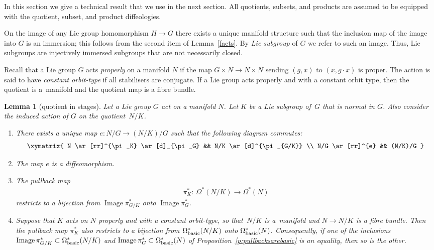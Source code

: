 \documentclass[pdftex]{sigma}
\numberwithin{equation}{section}
\newtheorem{Lemma}[Theorem]{Lemma}
\DeclareMathOperator {\image}{Image}
\begin{document}
In this section we give a technical result that we use in the next section.
All quotients, subsets, and products are assumed to be equipped
with the quotient, subset, and product dif\/feologies.

On the image of any Lie group homomorphism $H \to G$
there exists a unique manifold structure
such that the inclusion map of the image into $G$ is an immersion;
this follows from the second item of Lemma~\ref{facts}.
By \emph{Lie subgroup} of $G$ we refer to such an image.
Thus, Lie subgroups are injectively immersed subgroups
that are not necessarily closed.

Recall that a Lie group $G$ acts \emph{properly} on a manifold $N$
if the map $G\times N\to N\times N$ sending $(g,x)$ to $(x,g\cdot x)$
is proper. The action is said to have \emph{constant orbit-type}
if all stabilisers are conjugate.
If a Lie group acts properly and with a constant orbit type,
then the quotient is a~mani\-fold and the quotient map is a f\/ibre bundle.

\begin{Lemma}[quotient in stages] \label{l:q in stages}
Let a Lie group $G$ act on a manifold $N$.
Let $K$ be a Lie subgroup of~$G$
that is normal in $G$.
Also consider the induced action of $G$ on the quotient~$N/K$.
\begin{enumerate}\itemsep=0pt
\item[$(i)$]
There exists a unique map $ e \colon N/G \to (N/K) / G $
such that the following diagram commutes:
\begin{gather} \label{diagram q in stages}
\begin{split}
   \xymatrix{
 N \ar[rr]^{\pi_K} \ar[d]_{\pi_G} && N/K \ar[d]^{\pi_{G/K}} \\
 N/G \ar[rr]^{e} &&  (N/K)/G
}
\end{split}
\end{gather}

\item[$(ii)$]
The map $e$ is a diffeomorphism.

\item[$(iii)$]
The pullback map
\begin{gather*} \pi_K^* \colon \ \Omega^*(N/K) \to \Omega^*(N) \end{gather*}
restricts to a bijection from $\image \pi_{G/K}^*$ onto $\image \pi_G^*$.

\item[$(iv)$]
Suppose that $K$ acts on $N$ properly and with a constant orbit-type,
so that~$N/K$ is a~mani\-fold and $N \to N/K$ is a fibre bundle.
Then the pullback map $\pi_K^*$ also restricts to a bijection
from $\Omega^*_{\rm basic}(N/K)$ onto $\Omega^*_{\rm basic}(N)$.
Consequently, if one of the inclusions
$\image \pi_{G/K}^* \subset \Omega^*_{\rm basic}(N/K)$
and
$\image \pi_G^* \subset \Omega^*_{\rm basic}(N)$
of Proposition~{\rm \ref{p:pullbacksarebasic}} is an equality,
then so is the other.
\end{enumerate}
\end{Lemma}
\end{document}
